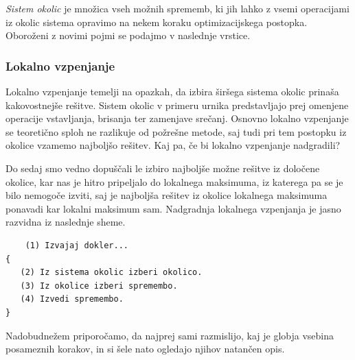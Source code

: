 \documentclass[a4paper, 10pt]{article}
\begin{document}
\emph{Sistem okolic} je množica vseh možnih sprememb, ki jih lahko z vsemi operacijami iz
okolic sistema opravimo na nekem koraku optimizacijskega postopka. Oboroženi z novimi pojmi
se podajmo v naslednje vrstice.

\subsubsection{Lokalno vzpenjanje }%

Lokalno vzpenjanje temelji na opazkah, da izbira širšega sistema okolic prinaša kakovostnejše
rešitve. Sistem okolic v primeru urnika predstavljajo prej omenjene operacije vstavljanja,
brisanja ter zamenjave srečanj. Osnovno lokalno vzpenjanje se teoretično sploh ne razlikuje
od požrešne metode, saj tudi pri tem postopku iz okolice vzamemo najboljšo rešitev. Kaj pa,
če bi lokalno vzpenjanje nadgradili?

Do sedaj smo vedno dopuščali le izbiro najboljše možne rešitve iz določene okolice, kar nas
je hitro pripeljalo do lokalnega maksimuma, iz katerega pa se je bilo nemogoče izviti, saj
je najboljša rešitev iz okolice lokalnega maksimuma ponavadi kar lokalni maksimum sam.
Nadgradnja lokalnega vzpenjanja je jasno razvidna iz naslednje sheme.

\begin{verbatim}
	(1) Izvajaj dokler...
{
   (2) Iz sistema okolic izberi okolico.
   (3) Iz okolice izberi spremembo.
   (4) Izvedi spremembo.
}
\end{verbatim}
%
Nadobudnežem priporočamo, da najprej sami razmislijo, kaj je globja vsebina posameznih
korakov, in si šele nato ogledajo njihov natančen opis.
\end{document}
